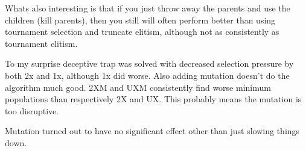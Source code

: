 \documentclass{article}
\begin{document}
\begin{empfile}
Whats also interesting is that if you just throw away the parents and use 
the children (kill parents), then you still will often perform better than
using tournament selection and truncate elitism, although not as 
consistently as tournament elitism.

To my surprise deceptive trap was solved with decreased selection pressure
by both 2x and 1x, although 1x did worse. Also adding mutation doesn't do
the algorithm much good. 2XM and UXM consistently find worse minimum populations
than respectively 2X and UX{.}
This probably means the mutation is too disruptive.

Mutation turned out to have no significant effect other than just slowing
things down.

\end{empfile}
\end{document}
